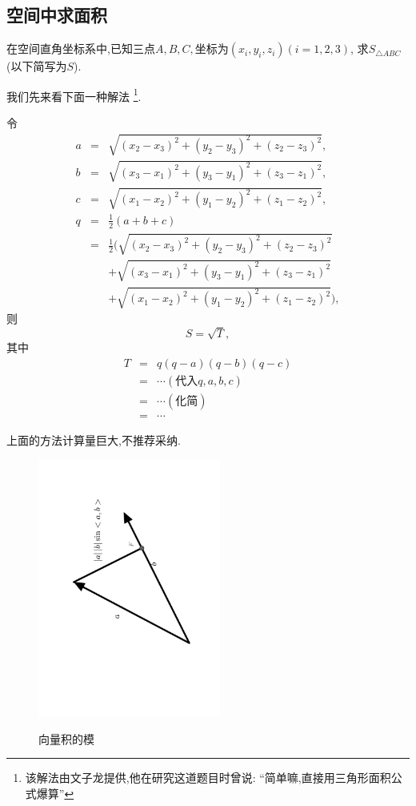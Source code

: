 \subsection{空间中求面积}

\prob 在空间直角坐标系中,已知三点$A,B,C,
\textrm{坐标为}(x_i,y_i,z_i)(i=1,2,3)$,
求$S_{\triangle ABC}$(以下简写为$S$).

我们先来看下面一种解法
\footnote{该解法由文子龙提供,他在研究这道题目时曾说:
``简单嘛,直接用三角形面积公式爆算''}.

\newcommand{\aaa}{\sqrt{(x_2-x_3)^2+(y_2-y_3)^2+(z_2-z_3)^2}}
\newcommand{\bbb}{\sqrt{(x_3-x_1)^2+(y_3-y_1)^2+(z_3-z_1)^2}}
\newcommand{\ccc}{\sqrt{(x_1-x_2)^2+(y_1-y_2)^2+(z_1-z_2)^2}}
\newcommand{\qqq}{q}

\sol
% 
令
\begin{eqnarray}
a&=&\aaa, \nonumber\\
b&=&\bbb, \nonumber\\
c&=&\ccc, \nonumber\\
q&=&\frac{1}{2}(a+b+c) \nonumber\\
 &=& \frac{1}{2}(\aaa \nonumber\\
 && +\bbb \nonumber\\
 && +\ccc \nonumber),
\end{eqnarray}
则$$S=\sqrt{T},$$
其中
\begin{eqnarray}
  T&=&q(q-a)(q-b)(q-c) \nonumber \\  
  &=&\cdots(\textrm{代入}q,a,b,c) \nonumber \\
  &=&\cdots(\textrm{化简}) \nonumber \\
  &=&\cdots \nonumber 
\end{eqnarray}
\solend

上面的方法计算量巨大,不推荐采纳.

\begin{figure}
  \centering
  \includegraphics[width=6cm,angle=270]{pic//3//33.pdf}\\
  \caption{向量积的模}\label{pro3}
\end{figure}

